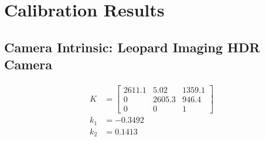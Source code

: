 \documentclass{erauthesis}
\begin{document}
% 

% 




% 


\backmatter

\chapter{Calibration Results} \label{appendix_calibration_results}
\section{Camera Intrinsic: Leopard Imaging HDR Camera}

\begin{subequations}
\begin{align}
K&=\left[\begin{array}{ccc}
2611.1 & 5.02 & 1359.1 \\
0 & 2605.3 & 946.4 \\
0 & 0 & 1
\end{array}\right]\\
    k_1 &= -0.3492\\  
    k_2 &= 0.1413
\end{align}
\end{subequations}

\end{document}
